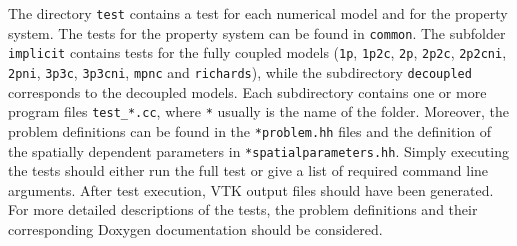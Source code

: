 The directory \texttt{test} contains a test for each numerical model and for 
the property system. The tests for the property system can be found in \texttt{common}. 
The subfolder \texttt{implicit} contains tests for the fully 
coupled models (\texttt{1p},  \texttt{1p2c},  \texttt{2p},  \texttt{2p2c},  
\texttt{2p2cni},  \texttt{2pni}, \texttt{3p3c},  \texttt{3p3cni},  \texttt{mpnc} and \texttt{richards}), while the subdirectory \texttt{decoupled} corresponds to the decoupled models. 
Each subdirectory contains one or more program files \texttt{test\_*.cc}, where \texttt{*} usually is the 
name of the folder. Moreover, the problem definitions can be found 
in the \texttt{*problem.hh} files and the definition of the spatially dependent parameters in \texttt{*spatialparameters.hh}. Simply executing the tests should either run the 
full test or give a list of required command line arguments. After test execution, 
VTK output files should have been generated. 
For more detailed descriptions of the tests, the problem definitions and their corresponding 
Doxygen documentation should be considered. 

